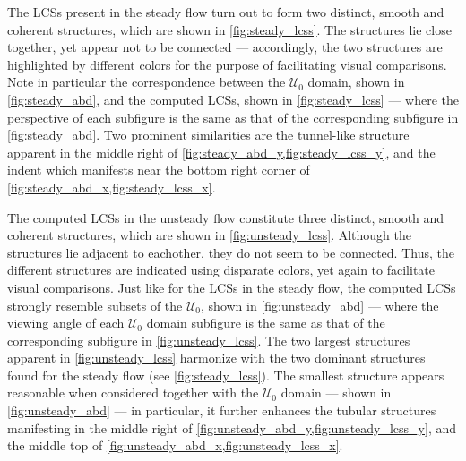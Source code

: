 

The LCSs present in the steady flow turn out to form two distinct,
smooth and coherent structures, which are shown in \cref{fig:steady_lcss}. The
structures lie close together, yet appear not to be connected --- accordingly,
the two structures are highlighted by different colors for the purpose of
facilitating visual comparisons. Note in particular the correspondence between
the $\mathcal{U}_{0}$  domain, shown in \cref{fig:steady_abd}, and the computed
LCSs, shown in \cref{fig:steady_lcss} --- where the perspective of each
subfigure is the same as that of the corresponding subfigure in
\cref{fig:steady_abd}. Two prominent similarities are the tunnel-like structure
apparent in the middle right of \cref{fig:steady_abd_y,fig:steady_lcss_y}, and
the indent which manifests near the bottom right corner of
\cref{fig:steady_abd_x,fig:steady_lcss_x}.



The computed LCSs in the unsteady flow constitute three distinct, smooth and
coherent structures, which are shown in \cref{fig:unsteady_lcss}. Although
the structures lie adjacent to eachother, they do not seem to be connected.
Thus, the different structures are indicated using disparate colors, yet
again to facilitate visual comparisons. Just like for the LCSs in the steady
flow, the computed LCSs strongly resemble subsets of the $\mathcal{U}_{0}$,
shown in \cref{fig:unsteady_abd} --- where the viewing angle of each
$\mathcal{U}_{0}$ domain subfigure is the same as that of the corresponding
subfigure in \cref{fig:unsteady_lcss}. The two largest structures apparent in
\cref{fig:unsteady_lcss} harmonize with the two dominant structures found for
the steady flow (see \cref{fig:steady_lcss}). The smallest structure appears
reasonable when considered together with the $\mathcal{U}_{0}$ domain --- shown
in \cref{fig:unsteady_abd} --- in particular, it further enhances the
tubular structures manifesting in the middle right of
\cref{fig:unsteady_abd_y,fig:unsteady_lcss_y}, and the middle top of
\cref{fig:unsteady_abd_x,fig:unsteady_lcss_x}.




